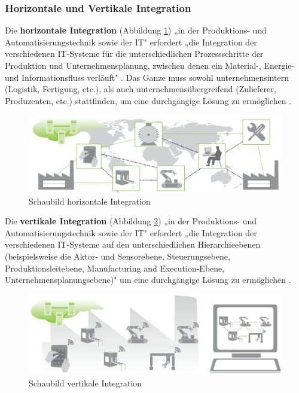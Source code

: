 \subsubsection{Horizontale und Vertikale Integration}\label{sec:HorizontaleVertikaleIntegration}
Die \textbf{horizontale Integration} (Abbildung \ref{fig:HorizontaleIntegration}) „in der Produktions- und Automatisierungstechnik sowie der IT" \cite[S.24]{12} erfordert „die Integration der verschiedenen IT-Systeme für die unterschiedlichen Prozessschritte der Produktion und Unternehmensplanung, zwischen denen ein Material-, Energie- und Informationsfluss verläuft" \cite[S.24]{12}. Das Ganze muss sowohl unternehmensintern (Logistik, Fertigung, etc.), als auch unternehmensübergreifend (Zulieferer, Produzenten, etc.) stattfinden, um eine durchgängige Lösung zu ermöglichen \cite[S.24]{12}.
\begin{figure}[h]
	\centering
	\includegraphics[width=0.7\linewidth]{Bilder/A3_HorizontaleIntegration}
	\caption{Schaubild horizontale Integration \cite[S.35]{12}}
	\label{fig:HorizontaleIntegration}
\end{figure}
\newline
\noindent Die \textbf{vertikale Integration} (Abbildung \ref{fig:VertikaleIntegration}) „in der Produktions- und Automatisierungstechnik sowie der IT" \cite[S.24]{12} erfordert „die Integration der verschiedenen IT-Systeme auf den unterschiedlichen Hierarchieebenen (beispielsweise die Aktor- und Sensorebene, Steuerungsebene, Produktionsleitebene, Manufacturing and Execution-Ebene, Unternehmensplanungsebene)" \cite[S.24]{12} um eine durchgängige Lösung zu ermöglichen \cite[S.24]{12}.
\begin{figure}[h]
	\centering
	\includegraphics[width=0.7\linewidth]{Bilder/A4_VertikaleIntegration}
	\caption{Schaubild vertikale Integration \cite[S.36]{12}}
	\label{fig:VertikaleIntegration}
\end{figure}

